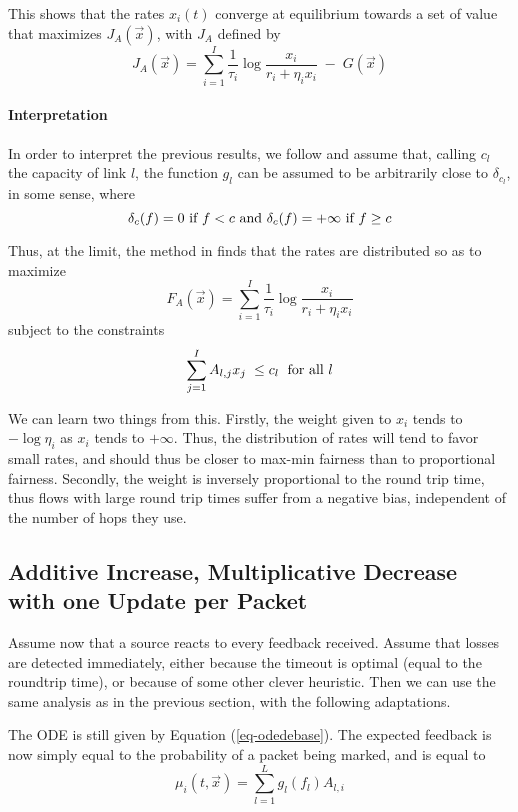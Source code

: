   This shows that
  the rates $x_{i}(t)$ converge at equilibrium towards a
  set of value that maximizes $J_{A}(\vec{x})$, with $J_{A}$ defined by
  $$
  J_{A}(\vec{x}) =
  \sum_{i=1}^I
   \frac{1}{\tau_i}\log \frac{x_{i}}{ r_{i}+ \eta_i x_{i}}
   \; -  \; G(\vec{x})
  $$
\paragraph{Interpretation}
In order to interpret the previous results, we follow \cite{KMT97}
and assume that, calling $c_{l}$ the capacity of link $l$, the
function $g_{l}$ can be assumed to be arbitrarily close to
$\delta_{c_{l}}$, in some sense, where
$$
\delta_{c}(f) = 0 \textrm{ if } f < c \textrm{ and } \delta_{c}(f) = + \infty \textrm{ if } f
\geq c
$$

Thus, at the limit, the method in \cite{KMT97} finds that the
rates are distributed so as to maximize
$$F_{A}(\vec{x})=\sum_{i=1}^I \frac{1}{\tau_i}\log \frac{x_{i}}{ r_{i}+ \eta_i x_{i}}$$
subject to the constraints
$$
\sum_{j=1}^I A_{l,j}x_{j} \; \leq c_{l} \; \textrm{ for all } l
$$

We can learn two things from this. Firstly, the weight given to
$x_{i}$ tends to $-\log \eta_i$ as $x_{i}$ tends to $+\infty$.
Thus, the distribution of rates will tend to favor small rates,
and should thus be closer to max-min fairness than to proportional
fairness. Secondly, the weight is inversely proportional to the
round trip time, thus flows with large round trip times suffer
from a negative bias, independent of the number of hops they use.
%

\subsection{Additive Increase, Multiplicative Decrease with one
Update per Packet}
 Assume now that a source reacts to every feedback received.
 Assume that losses are detected immediately, either because the
 timeout is optimal (equal to the roundtrip time), or because of
 some other clever heuristic. Then we can use the same analysis as
 in the previous section, with the following adaptations.

 The ODE is still given by Equation (\ref{eq-odedebase}). The
 expected feedback is now simply equal to the probability of a
 packet being marked, and is equal to
 $$
 \mu_i(t, \vec{x}) = \sum_{l=1}^{L}
        g_{l}(f_{l})A_{l,i}
 $$

